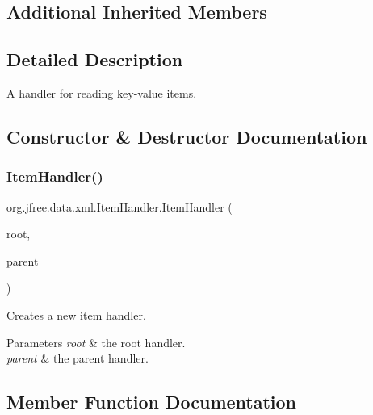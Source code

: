 \subsection*{Additional Inherited Members}


\subsection{Detailed Description}
A handler for reading key-\/value items. 

\subsection{Constructor \& Destructor Documentation}
\mbox{\label{classorg_1_1jfree_1_1data_1_1xml_1_1_item_handler_a5721292470132649314a94019ff0de02}} 
\subsubsection{\texorpdfstring{Item\+Handler()}{ItemHandler()}}
{\footnotesize\ttfamily org.\+jfree.\+data.\+xml.\+Item\+Handler.\+Item\+Handler (\begin{DoxyParamCaption}\item[{\mbox{\hyperlink{classorg_1_1jfree_1_1data_1_1xml_1_1_root_handler}{Root\+Handler}}}]{root,  }\item[{Default\+Handler}]{parent }\end{DoxyParamCaption})}

Creates a new item handler.


\begin{DoxyParams}{Parameters}
{\em root} & the root handler. \\
\hline
{\em parent} & the parent handler. \\
\hline
\end{DoxyParams}


\subsection{Member Function Documentation}
\mbox{\label{classorg_1_1jfree_1_1data_1_1xml_1_1_item_handler_a01ee05dd1aceaa48af6b402e7d45d45e}} 
